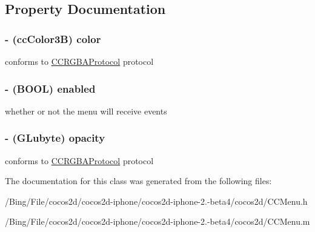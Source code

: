 \subsection{Property Documentation}
\hypertarget{interface_c_c_menu_a49b749a8f0da9a6d377fb735301f7db8}{
\subsubsection[{color}]{\setlength{\rightskip}{0pt plus 5cm}-\/ ({\bf cc\-Color3\-B}) {\bf color}}}\label{interface_c_c_menu_a49b749a8f0da9a6d377fb735301f7db8}
conforms to \hyperlink{protocol_c_c_r_g_b_a_protocol-p}{C\-C\-R\-G\-B\-A\-Protocol} protocol \hypertarget{interface_c_c_menu_a5cd5e32ca21936168d1dcc704ca1a82f}{
\subsubsection[{enabled}]{\setlength{\rightskip}{0pt plus 5cm}-\/ (B\-O\-O\-L) {\bf enabled}}}\label{interface_c_c_menu_a5cd5e32ca21936168d1dcc704ca1a82f}
whether or not the menu will receive events \hypertarget{interface_c_c_menu_aa8e735d5821c296df27a9238325ec427}{
\subsubsection[{opacity}]{\setlength{\rightskip}{0pt plus 5cm}-\/ (G\-Lubyte) {\bf opacity}}}\label{interface_c_c_menu_aa8e735d5821c296df27a9238325ec427}
conforms to \hyperlink{protocol_c_c_r_g_b_a_protocol-p}{C\-C\-R\-G\-B\-A\-Protocol} protocol 

The documentation for this class was generated from the following files\-:\begin{DoxyCompactItemize}
\item 
/\-Bing/\-File/cocos2d/cocos2d-\/iphone/cocos2d-\/iphone-\/2.-\/beta4/cocos2d/C\-C\-Menu.\-h\item 
/\-Bing/\-File/cocos2d/cocos2d-\/iphone/cocos2d-\/iphone-\/2.-\/beta4/cocos2d/C\-C\-Menu.\-m\end{DoxyCompactItemize}
